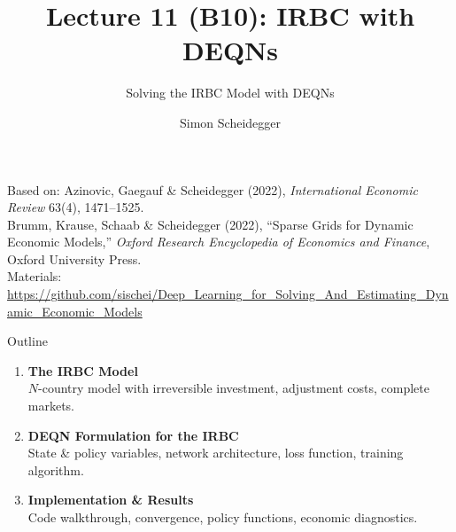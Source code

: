 \documentclass[aspectratio=169,11pt]{beamer}
\title[Lecture 11 (B10)]{Lecture 11 (B10): IRBC with DEQNs}
\subtitle{Solving the IRBC Model with DEQNs}
\author{Simon Scheidegger}
\institute{HEC, University of Lausanne}
\date{}
\begin{document}
\newcommand{\exercisepause}{%
  \tikz[baseline=(X.base)]{\node[fill=darkgreen!80!black, text=white,
  rounded corners=2pt, inner sep=3pt, font=\scriptsize\bfseries](X){PAUSE --- 5 min};}}



{
\begin{frame}
\titlepage
\vspace{-0.4cm}
\begin{center}
{\footnotesize Based on: Azinovic, Gaegauf \& Scheidegger (2022), \emph{International Economic Review} 63(4), 1471--1525.\\
Brumm, Krause, Schaab \& Scheidegger (2022), ``Sparse Grids for Dynamic Economic Models,'' \emph{Oxford Research Encyclopedia of Economics and Finance}, Oxford University Press.}\\[4pt]
{\footnotesize Materials: \url{https://github.com/sischei/Deep_Learning_for_Solving_And_Estimating_Dynamic_Economic_Models}}
\end{center}
\end{frame}
}

\begin{frame}{Outline}
\begin{enumerate}
    \item \textbf{The IRBC Model}\\
    {\small $N$-country model with irreversible investment, adjustment costs, complete markets.}

    \vspace{0.4em}
    \item \textbf{DEQN Formulation for the IRBC}\\
    {\small State \& policy variables, network architecture, loss function, training algorithm.}

    \vspace{0.4em}
    \item \textbf{Implementation \& Results}\\
    {\small Code walkthrough, convergence, policy functions, economic diagnostics.}
\end{enumerate}
\end{frame}
\end{document}
